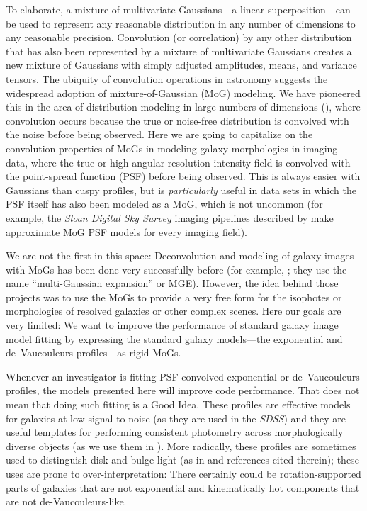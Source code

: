 \documentclass[12pt,pdftex,preprint]{aastex}
\newcommand{\project}[1]{\textsl{#1}}
\begin{document}
To elaborate, a mixture of multivariate Gaussians---a linear
superposition---can be used to represent any reasonable distribution
in any number of dimensions to any reasonable precision.  Convolution
(or correlation) by any other distribution that has also been
represented by a mixture of multivariate Gaussians creates a new
mixture of Gaussians with simply adjusted amplitudes, means, and
variance tensors.  The ubiquity of convolution operations in astronomy
suggests the widespread adoption of mixture-of-Gaussian (MoG)
modeling.  We have pioneered this in the area of distribution modeling
in large numbers of dimensions (\citealt{xd, xdqso, xdqsoz}), where
convolution occurs because the true or noise-free distribution is
convolved with the noise before being observed.  Here we are going to
capitalize on the convolution properties of MoGs in modeling galaxy
morphologies in imaging data, where the true or
high-angular-resolution intensity field is convolved with the
point-spread function (PSF) before being observed.  This is always
easier with Gaussians than cuspy profiles, but is \emph{particularly}
useful in data sets in which the PSF itself has also been modeled as a
MoG, which is not uncommon (for example, the \project{Sloan Digital
  Sky Survey} imaging pipelines described by \citealt{lupton} make
approximate MoG PSF models for every imaging field).

We are not the first in this space: Deconvolution and modeling of
galaxy images with MoGs has been done very successfully before (for
example, \citealt{bendinelli, emsellem, bendinelli2, cappellari}; they
use the name ``multi-Gaussian expansion'' or MGE).  However, the idea
behind those projects was to use the MoGs to provide a very free form
for the isophotes or morphologies of resolved galaxies or other
complex scenes.  Here our goals are very limited: We want to improve
the performance of standard galaxy image model fitting by expressing
the standard galaxy models---the exponential and de~Vaucouleurs
profiles---as rigid MoGs.

Whenever an investigator is fitting PSF-convolved exponential or
de~Vaucouleurs profiles, the models presented here will improve code
performance.  That does not mean that doing such fitting is a Good
Idea.  These profiles are effective models for galaxies at low
signal-to-noise (as they are used in the \project{SDSS}) and they are
useful templates for performing consistent photometry across
morphologically diverse objects (as we use them in \citealt{bundy}).
More radically, these profiles are sometimes used to distinguish disk
and bulge light (as in \citealt{bulgedisk} and references cited
therein); these uses are prone to over-interpretation: There certainly
could be rotation-supported parts of galaxies that are not exponential
and kinematically hot components that are not de-Vaucouleurs-like.
\end{document}
